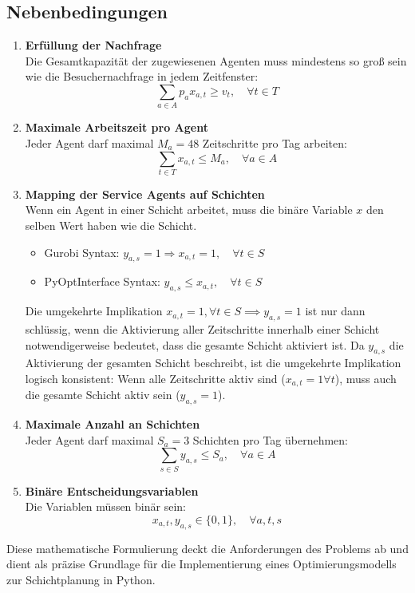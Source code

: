 \subsection*{Nebenbedingungen}
\begin{enumerate}
    \item \textbf{Erfüllung der Nachfrage}\\
          Die Gesamtkapazität der zugewiesenen Agenten muss mindestens so groß sein wie die Besuchernachfrage in jedem Zeitfenster:
          $$\sum_{a \in A} p_a x_{a,t} \geq v_t, \quad \forall t \in T$$
    \item \textbf{Maximale Arbeitszeit pro Agent}\\
          Jeder Agent darf maximal $M_a = 48$ Zeitschritte pro Tag arbeiten:
          $$\sum_{t \in T} x_{a,t} \leq M_a, \quad \forall a \in A$$
    \item \textbf{Mapping der Service Agents auf Schichten}\\
          Wenn ein Agent in einer Schicht arbeitet, muss die binäre Variable $x$ den selben Wert haben wie die Schicht.
          \begin{itemize}
              \item Gurobi Syntax: $ y_{a,s} = 1 \Rightarrow x_{a,t} = 1, \quad \forall t \in S $
              \item PyOptInterface Syntax: $ y_{a,s} \leq x_{a,t}, \quad \forall t \in S $
          \end{itemize}
          Die umgekehrte Implikation $ x_{a,t} = 1 , \forall t \in S \implies y_{a,s} = 1 $ ist nur dann schlüssig, wenn die Aktivierung aller Zeitschritte innerhalb einer Schicht notwendigerweise bedeutet, dass die gesamte Schicht aktiviert ist. Da $y_{a,s}$ die Aktivierung der gesamten Schicht beschreibt, ist die umgekehrte Implikation logisch konsistent: Wenn alle Zeitschritte aktiv sind ($x_{a,t} = 1 \forall t$), muss auch die gesamte Schicht aktiv sein ($y_{a,s} = 1$).
    \item \textbf{Maximale Anzahl an Schichten}\\
          Jeder Agent darf maximal $S_a = 3$ Schichten pro Tag übernehmen:
          $$\sum_{s \in S} y_{a,s} \leq S_a,\quad\forall a\in A$$
    \item \textbf{Binäre Entscheidungsvariablen}\\
          Die Variablen müssen binär sein:
          $$x_{a,t}, y_{a,s} \in \{0,1\},\quad\forall a,t,s$$
\end{enumerate}

Diese mathematische Formulierung deckt die Anforderungen des Problems ab und dient als präzise Grundlage für die Implementierung eines Optimierungsmodells zur Schichtplanung in Python.
